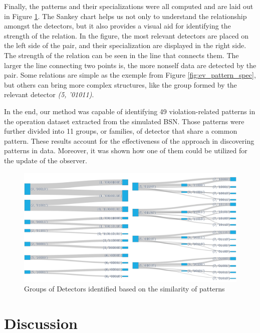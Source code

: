 Finally, the patterns and their specializations were all computed and are laid out in Figure \ref{fig:ev_sankey}. The Sankey chart helps us not only to understand the relationship amongst the detectors, but it also provides a visual aid for identifying the strength of the relation. In the figure, the most relevant detectors are placed on the left side of the pair, and their specialization are displayed in the right side. The strength of the relation can be seen in the line that connects them. The larger the line connecting two points is, the more nonself data are detected by the pair. Some relations are simple as the exemple from Figure \ref{fig:ev_pattern_spec}, but others can bring more complex structures, like the group formed by the relevant detector \textit{(5, '01011)}.

In the end, our method was capable of identifying 49 violation-related patterns in the operation dataset extracted from the simulated BSN. Those patterns were further divided into 11 groups, or families, of detector that share a common pattern. These results account for the effectiveness of the approach in discovering patterns in data. Moreover, it was shown how one of them could be utilized for the update of the observer.

\begin{figure}[]
	\centering
	\includegraphics[width=\textwidth, keepaspectratio]{img/sankey2.png}
	\caption{Groups of Detectors identified based on the similarity of patterns}
	\label{fig:ev_sankey}
\end{figure}

\section{Discussion}

